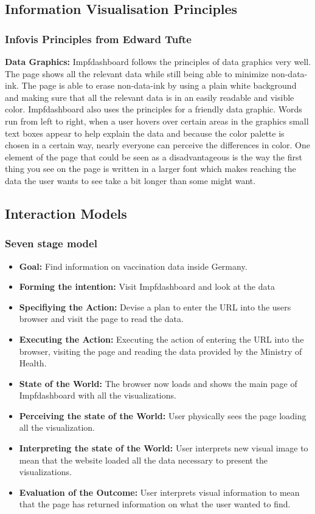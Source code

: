 \documentclass[12pt, letterpaper]{article}
\begin{document}
\subsection{Information Visualisation Principles}
\subsubsection{Infovis Principles from Edward Tufte}

\textbf{Data Graphics:}
Impfdashboard follows the principles of data graphics very well. The page shows all the relevant data while still being able to minimize non-data-ink. The page is able to erase non-data-ink by using a plain white background and making sure that all the relevant data is in an easily readable and visible color.
Impfdashboard also uses the principles for a friendly data graphic. Words run from left to right, when a user hovers over certain areas in the graphics small text boxes appear to help explain the data and because the color palette is chosen in a certain way, nearly everyone can perceive the differences in color. One element of the page that could be seen as a disadvantageous is the way the first thing you see on the page is written in a larger font which makes reaching the data the user wants to see take a bit longer than some might want.

\subsection{Interaction Models}
\subsubsection{Seven stage model}
\begin{itemize}
    \item\textbf{Goal:}
    Find information on vaccination data inside Germany.
    \item\textbf{Forming the intention:}
    Visit Impfdashboard and look at the data
    \item\textbf{Specifiying the Action:}
    Devise a plan to enter the URL into the users browser and visit the page to read the data.
    \item\textbf{Executing the Action:}
    Executing the action of entering the URL into the browser, visiting the page and reading the data provided by the Ministry of Health.
    \item\textbf{State of the World:}
    The browser now loads and shows the main page of Impfdashboard with all the visualizations.
    \item\textbf{Perceiving the state of the World:}
    User physically sees the page loading all the visualization.
    \item\textbf{Interpreting the state of the World:}
    User interprets new visual image to mean that the website loaded all the data necessary to present the visualizations.
    \item\textbf{Evaluation of the Outcome:}
    User interprets visual information to mean that the page has returned information on what the user wanted to find.
\end{itemize}
\newpage
\end{document}
